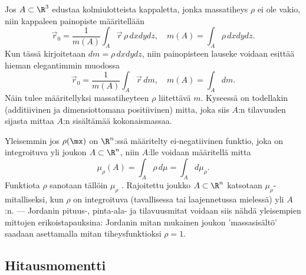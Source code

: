 Jos $A \subset \R^3$ edustaa kolmiulotteista kappaletta, jonka massatiheys $\rho$ ei ole vakio,
niin kappaleen painopiste määritellään
\[
\vec r_0=\frac{1}{m(A)}\int_A \vec r\,\rho\,dxdydz, \quad m(A) = \int_A \rho\,dxdydz.
\]
Kun tässä kirjoitetaan $dm=\rho\,dxdydz$, niin painopisteen lauseke voidaan esittää hieman
elegantimmin muodossa
\[
\vec r_0=\frac{1}{m(A)}\int_A \vec r\,dm, \quad m(A)=\int_A dm.
\]
Näin tulee määritellyksi massatiheyteen $\rho$ liitettävä  $m$. Kyseessä on 
todellakin (additiivinen ja dimensiottomana positiivinen) mitta, joka siis $A$:n tilavuuden
sijasta mittaa $A$:n sisältämää kokonaismassaa. 

Yleisemmin jos $\rho(\mx)$ on $\R^n$:ssä määritelty ei-negatiivinen funktio, joka on 
integroituva yli joukon $A \subset \R^n$, niin $A$:lle voidaan  määritellä mitta
\[ 
\mu_\rho(A) = \int_A \rho\,d\mu = \int_A d\mu_\rho. 
\]
%
Funktiota $\rho$ sanotaan tällöin  $\mu_\rho$ . Rajoitettu
joukko $A \subset \R^n$ katsotaan $\mu_\rho$-mitalliseksi, kun $\rho$ on integroituva 
(tavallisessa tai laajennetussa mielessä) yli $A$:n. --- Jordanin pituus-, pinta-ala- ja
tilavuusmitat voidaan siis nähdä yleisempien mittojen erikoistapauksina: Jordanin mitan 
mukainen joukon 'massasisältö' saadaan asettamalla mitan tiheysfunktioksi $\rho=1$.

\subsection*{Hitausmomentti} 

